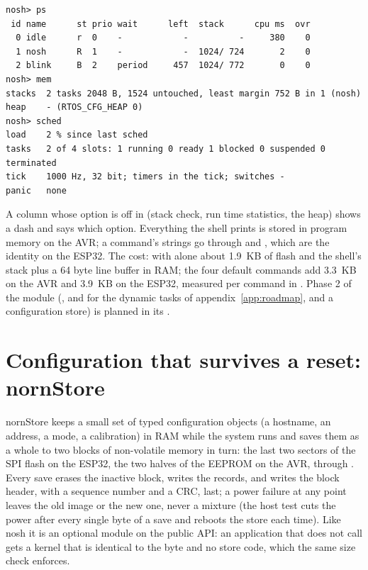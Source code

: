 \begin{lstlisting}
nosh> ps
 id name      st prio wait      left  stack      cpu ms  ovr
  0 idle      r  0    -            -          -     380    0
  1 nosh      R  1    -            -  1024/ 724       2    0
  2 blink     B  2    period     457  1024/ 772       0    0
nosh> mem
stacks  2 tasks 2048 B, 1524 untouched, least margin 752 B in 1 (nosh)
heap    - (RTOS_CFG_HEAP 0)
nosh> sched
load    2 % since last sched
tasks   2 of 4 slots: 1 running 0 ready 1 blocked 0 suspended 0 terminated
tick    1000 Hz, 32 bit; timers in the tick; switches -
panic   none
\end{lstlisting}

A column whose option is off in  (stack check, run time statistics,
the heap) shows a dash and says which option. Everything the shell prints is stored in
program memory on the AVR; a command's strings go through  and
, which are the identity on the ESP32. The cost: with
 alone about 1.9~KB of flash and the shell's stack plus a 64 byte line
buffer in RAM; the four default commands add 3.3~KB on the AVR and 3.9~KB on the ESP32,
measured per command in . Phase 2 of the
module (,  and  for the dynamic tasks of
appendix~\ref{app:roadmap}, and a configuration store) is planned in its
.

\section{Configuration that survives a reset: nornStore}
\label{sec:nornstore}

nornStore keeps a small set of typed configuration objects (a hostname, an address, a
mode, a calibration) in RAM while the system runs and saves them as a whole to two
blocks of non-volatile memory in turn: the last two sectors of the SPI flash on the
ESP32, the two halves of the EEPROM on the AVR, through . Every save
erases the inactive block, writes the records, and writes the block header, with a
sequence number and a CRC, last; a power failure at any point leaves the old image or
the new one, never a mixture (the host test cuts the power after every single byte of
a save and reboots the store each time). Like nosh it is an optional module on the
public API: an application that does not call  gets a kernel that is
identical to the byte and no store code, which the same size check enforces.

